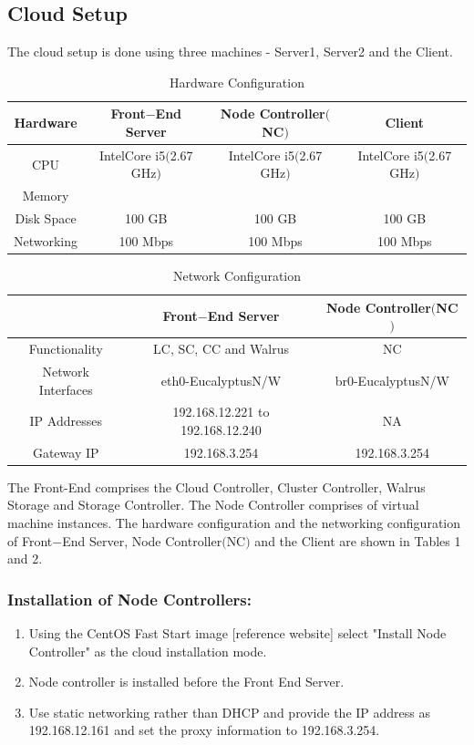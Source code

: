 \documentclass[a4page,12pt]{article}
\begin{document}
\subsection{Cloud Setup}
The cloud setup is done using three machines - Server1, Server2 and the
Client.\\
\begin{table}[h]
\begin{tabular}{|c|c|c|c|}
\hline 
Hardware & Front$-$End Server & Node Controller$($NC$)$ & Client \tabularnewline
\hline
\hline
CPU & IntelCore i5$($2.67 GHz$)$ & IntelCore i5$($2.67 GHz$)$ & IntelCore i5$($2.67 GHz$)$
\tabularnewline
\hline 
Memory &  &  & 
\tabularnewline
\hline 
Disk Space & 100 GB & 100 GB & 100 GB
\tabularnewline
\hline 
Networking & 100 Mbps & 100 Mbps & 100 Mbps
\tabularnewline
\hline 
\end{tabular}
\caption{Hardware Configuration}
\end{table}
\begin{table}[h]
\centering
\begin{tabular}{|c|c|c|}
\hline 
  & Front$-$End Server & Node Controller$($NC$)$\tabularnewline
\hline
\hline
Functionality & LC, SC, CC and Walrus & NC
\tabularnewline
\hline 
Network Interfaces & eth0-EucalyptusN/W & br0-EucalyptusN/W
\tabularnewline
\hline 
IP Addresses & 192.168.12.221 to 192.168.12.240 & NA
\tabularnewline
\hline 
Gateway IP & 192.168.3.254 & 192.168.3.254
\tabularnewline
\hline 
\end{tabular}
\caption{Network Configuration}
\end{table}
The Front-End comprises the Cloud Controller, Cluster Controller, Walrus Storage and Storage Controller. The Node Controller comprises of virtual machine instances. The hardware configuration and the networking configuration of Front$-$End Server, Node Controller$($NC$)$ and the Client are shown in Tables 1 and 2.

\subsubsection{Installation of Node Controllers:}
\begin{enumerate}
\item Using the CentOS Fast Start image [reference website] select "Install Node Controller"  as the cloud installation mode. 

\item Node controller is installed before the Front End Server.

\item Use static networking rather than DHCP and provide the IP address as 192.168.12.161 and set the proxy information to 192.168.3.254.
\end{enumerate}
\end{document}
